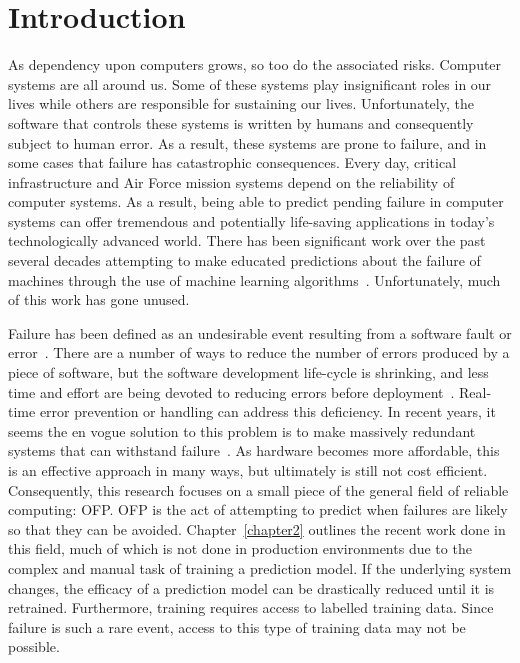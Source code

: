 \chapter{Introduction} \label{chapter1}
As dependency upon computers grows, so too do the associated risks.  Computer
systems are all around us.  Some of these systems play insignificant
roles in our lives while others are responsible for sustaining our lives.
Unfortunately, the software that controls these systems is written by humans
and consequently subject to human error.  As a result, these systems are prone
to failure, and in some cases that failure has catastrophic consequences.
Every day, critical infrastructure and Air Force mission systems depend on the
reliability of computer systems.  As a result, being able to predict pending
failure in computer systems can offer tremendous and potentially life-saving
applications in today's technologically advanced world.  There has been
significant work over the past several decades attempting to make educated
predictions about the failure of machines through the use of machine learning
algorithms~\cite{salfnerSurvey}.  Unfortunately, much of this work has gone
unused.  

Failure has been defined as an undesirable event resulting from a software
fault or error~\cite{salfnerSurvey}.  There are a number of ways to reduce the
number of errors produced by a piece of software, but the software development
life-cycle is shrinking, and less time and effort are being devoted to reducing
errors before deployment~\cite{schmidt2016}.  Real-time error prevention or
handling can address this deficiency.  In recent years, it seems the
en vogue solution to this problem is to make massively redundant systems
that can withstand failure~\cite{bauer2012}.  As hardware becomes more
affordable, this is an effective approach in many ways, but ultimately is still
not cost efficient.  Consequently, this research focuses on a small piece of
the general field of reliable computing: \ac{OFP}.  \ac{OFP} is the act of
attempting to predict when failures are likely so that they can be avoided.
Chapter~\ref{chapter2} outlines the recent work done in this field, much of
which is not done in production environments due to the complex and manual task
of training a prediction model.  If the underlying system changes, the efficacy
of a prediction model can be drastically reduced until it is retrained.
Furthermore, training requires access to labelled training data.  Since failure
is such a rare event, access to this type of training data may not be possible.

